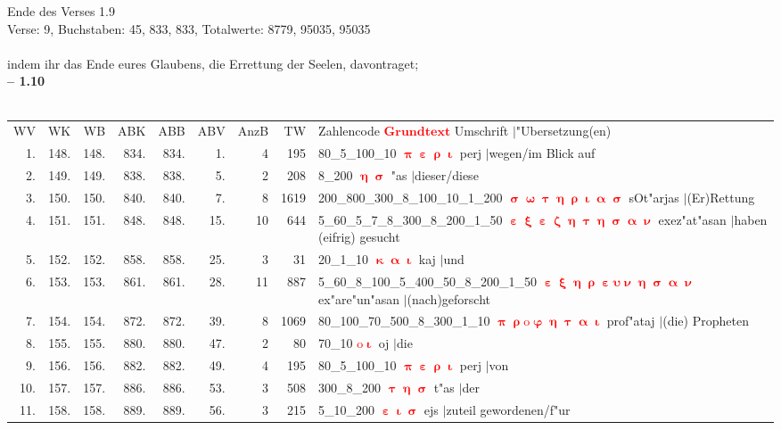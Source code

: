 \documentclass[a4paper,10pt,landscape]{article}
\begin{document}
Ende des Verses 1.9\\
Verse: 9, Buchstaben: 45, 833, 833, Totalwerte: 8779, 95035, 95035\\
\\
indem ihr das Ende eures Glaubens, die Errettung der Seelen, davontraget;\\
\newpage 
{\bf -- 1.10}\\
\medskip \\
\begin{tabular}{rrrrrrrrp{120mm}}
WV&WK&WB&ABK&ABB&ABV&AnzB&TW&Zahlencode \textcolor{red}{$\boldsymbol{Grundtext}$} Umschrift $|$"Ubersetzung(en)\\
1.&148.&148.&834.&834.&1.&4&195&80\_5\_100\_10 \textcolor{red}{$\boldsymbol{\uppi\upepsilon\uprho\upiota}$} perj $|$wegen/im Blick auf\\
2.&149.&149.&838.&838.&5.&2&208&8\_200 \textcolor{red}{$\boldsymbol{\upeta\upsigma}$} "as $|$dieser/diese\\
3.&150.&150.&840.&840.&7.&8&1619&200\_800\_300\_8\_100\_10\_1\_200 \textcolor{red}{$\boldsymbol{\upsigma\upomega\uptau\upeta\uprho\upiota\upalpha\upsigma}$} sOt"arjas $|$(Er)Rettung\\
4.&151.&151.&848.&848.&15.&10&644&5\_60\_5\_7\_8\_300\_8\_200\_1\_50 \textcolor{red}{$\boldsymbol{\upepsilon\upxi\upepsilon\upzeta\upeta\uptau\upeta\upsigma\upalpha\upnu}$} exez"at"asan $|$haben (eifrig) gesucht\\
5.&152.&152.&858.&858.&25.&3&31&20\_1\_10 \textcolor{red}{$\boldsymbol{\upkappa\upalpha\upiota}$} kaj $|$und\\
6.&153.&153.&861.&861.&28.&11&887&5\_60\_8\_100\_5\_400\_50\_8\_200\_1\_50 \textcolor{red}{$\boldsymbol{\upepsilon\upxi\upeta\uprho\upepsilon\upsilon\upnu\upeta\upsigma\upalpha\upnu}$} ex"are"un"asan $|$(nach)geforscht\\
7.&154.&154.&872.&872.&39.&8&1069&80\_100\_70\_500\_8\_300\_1\_10 \textcolor{red}{$\boldsymbol{\uppi\uprho\mathrm{o}\upvarphi\upeta\uptau\upalpha\upiota}$} prof"ataj $|$(die) Propheten\\
8.&155.&155.&880.&880.&47.&2&80&70\_10 \textcolor{red}{$\boldsymbol{\mathrm{o}\upiota}$} oj $|$die\\
9.&156.&156.&882.&882.&49.&4&195&80\_5\_100\_10 \textcolor{red}{$\boldsymbol{\uppi\upepsilon\uprho\upiota}$} perj $|$von\\
10.&157.&157.&886.&886.&53.&3&508&300\_8\_200 \textcolor{red}{$\boldsymbol{\uptau\upeta\upsigma}$} t"as $|$der\\
11.&158.&158.&889.&889.&56.&3&215&5\_10\_200 \textcolor{red}{$\boldsymbol{\upepsilon\upiota\upsigma}$} ejs $|$zuteil gewordenen/f"ur\\

\end{tabular}
\end{document}
